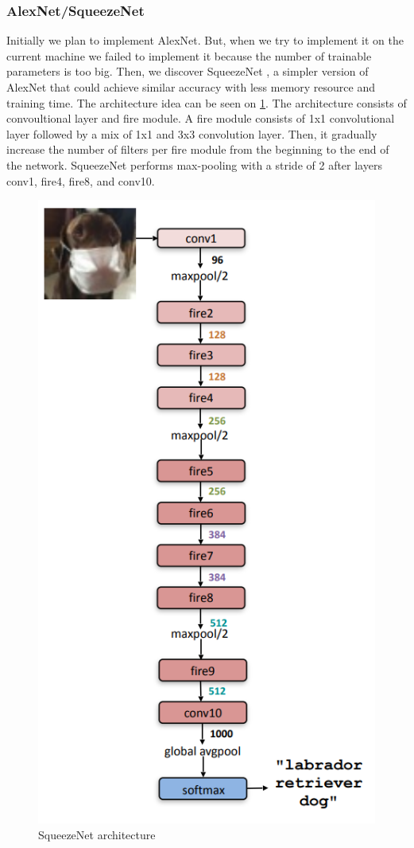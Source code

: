 \subsubsection{AlexNet/SqueezeNet}
Initially we plan to implement AlexNet. But, when we try to implement it on the current machine we failed to implement it because the number of trainable parameters is too big. Then, we discover SqueezeNet \cite{SqueezeNet}, a simpler version of AlexNet that could achieve similar accuracy with less memory resource and training time. The architecture idea can be seen on \ref{fig:squeezenet_arch}. The architecture consists of convoultional layer and fire module. A fire module consists of 1x1 convolutional layer followed by a mix of 1x1 and 3x3 convolution layer. Then, it gradually increase the number of filters per fire module from the beginning to the end of the network. SqueezeNet performs max-pooling with a stride of 2 after layers conv1, fire4, fire8, and conv10.

\begin{figure}[h]
	\includegraphics[scale=0.5]{figures/squeezenet}
	\centering
	\caption{SqueezeNet architecture}
	\label{fig:squeezenet_arch}
\end{figure}

